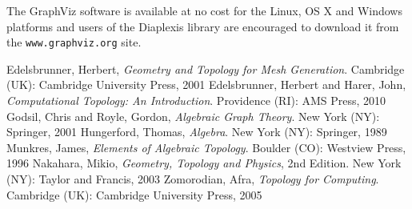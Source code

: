 \documentclass[12pt,letterpaper]{report}
\begin{document}
The GraphViz software is available at no cost for the Linux, OS X and Windows platforms and users of the 
Diaplexis library are encouraged to download it from the \texttt{www.graphviz.org} site. 
\begin{thebibliography}{99}
 Edelsbrunner, Herbert, \emph{Geometry and Topology for Mesh Generation}. Cambridge (UK): 
Cambridge University Press, 2001
 Edelsbrunner, Herbert and Harer, John, \emph{Computational Topology: An Introduction}. 
Providence (RI): AMS Press, 2010
 Godsil, Chris and Royle, Gordon, \emph{Algebraic Graph Theory}. New York (NY): Springer, 2001
 Hungerford, Thomas, \emph{Algebra}. New York (NY): Springer, 1989
 Munkres, James, \emph{Elements of Algebraic Topology}. Boulder (CO): Westview Press, 1996
 Nakahara, Mikio, \emph{Geometry, Topology and Physics}, 2nd Edition. New York (NY): Taylor and 
Francis, 2003 
 Zomorodian, Afra, \emph{Topology for Computing}. Cambridge (UK): Cambridge University Press, 2005
\end{thebibliography}
\end{document}
